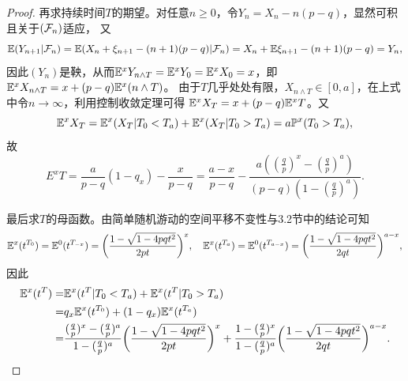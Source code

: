 \begin{enumerate}
\begin{proof}
        再求持续时间$T$的期望。对任意$n\geqslant0$，令$Y_n=X_n-n(p-q)$，显然可积且关于$(\mathcal{F}_n)$适应，
        又\[\mathbb{E}(Y_{n+1}|\mathcal{F}_n)=\mathbb{E}(X_n+\xi_{n+1}-(n+1)(p-q)|\mathcal{F}_n)=X_n+\mathbb{E}\xi_{n+1}-(n+1)(p-q)=Y_n,\]
        因此$(Y_n)$是鞅，从而$\mathbb{E}^x Y_{n\land T}=\mathbb{E}^x Y_0=\mathbb{E}^x X_0=x$，即$\mathbb{E}^x X_{n\land T}=x+(p-q)\mathbb{E}^x(n\land T)$。
        由于$T$几乎处处有限，$X_{n\land T}\in[0,a]$，在上式中令$n\to\infty$，利用控制收敛定理可得
        $\mathbb{E}^x X_T=x+(p-q)\mathbb{E}^x T$。又\[\mathbb{E}^x X_T=\mathbb{E}^x(X_T|T_0<T_a)+\mathbb{E}^x(X_T|T_0>T_a)=a\mathbb{P}^x(T_0>T_a),\]
        故\[E^x T=\frac{a}{p-q}(1-q_x)-\frac{x}{p-q}=\frac{a-x}{p-q}-\frac{a((\frac{q}{p})^x-(\frac{q}{p})^a)}{(p-q)(1-(\frac{q}{p})^a)}.\]

        最后求$T$的母函数。由简单随机游动的空间平移不变性与3.2节中的结论可知
        \[\mathbb{E}^x(t^{T_0})=\mathbb{E}^0(t^{T_{-x}})=\bigg(\frac{1-\sqrt{1-4pqt^2}}{2pt}\bigg)^x,\quad
        \mathbb{E}^x(t^{T_a})=\mathbb{E}^0(t^{T_{a-x}})=\bigg(\frac{1-\sqrt{1-4pqt^2}}{2qt}\bigg)^{a-x},\]因此
        \begin{align*}
            \mathbb{E}^x(t^T)=&\mathbb{E}^x(t^T|T_0<T_a)+\mathbb{E}^x(t^T|T_0>T_a)\\
            =&q_x\mathbb{E}^x(t^{T_0})+(1-q_x)\mathbb{E}^x(t^{T_a})\\
            =&\frac{(\frac{q}{p})^x-(\frac{q}{p})^a}{1-(\frac{q}{p})^a}\bigg(\frac{1-\sqrt{1-4pqt^2}}{2pt}\bigg)^x
            +\frac{1-(\frac{q}{p})^x}{1-(\frac{q}{p})^a}\bigg(\frac{1-\sqrt{1-4pqt^2}}{2qt}\bigg)^{a-x}.
        \end{align*}
    \end{proof}
\end{enumerate}

